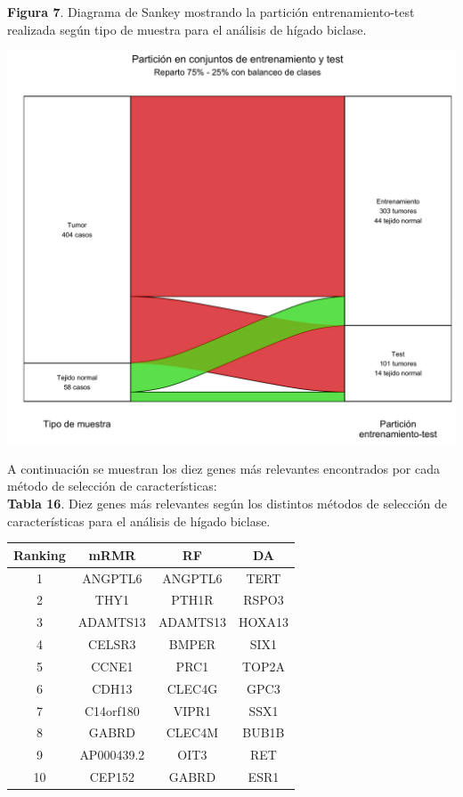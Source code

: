 \newpage
\begin{center}
	\textbf{Figura 7}. Diagrama de Sankey mostrando la partición entrenamiento-test realizada según tipo de muestra para el análisis de hígado biclase.
\end{center}
\begin{center}
	\includegraphics[width=.75\textwidth]{figuras/07_higado_biclase_sankey.png}
\end{center}

A continuación se muestran los diez genes más relevantes encontrados por cada método de selección de características:\\

\textbf{Tabla 16}. Diez genes más relevantes según los distintos métodos de selección de características para el análisis de hígado biclase.

\begin{table}[H]
	\centering
	\begin{tabular}{cccc}
		\hline
		\textbf{Ranking} & \textbf{mRMR} & \textbf{RF} & \textbf{DA} \\ \hline
		1                & ANGPTL6       & ANGPTL6     & TERT        \\
		2                & THY1          & PTH1R       & RSPO3       \\
		3                & ADAMTS13      & ADAMTS13    & HOXA13      \\
		4                & CELSR3        & BMPER       & SIX1        \\
		5                & CCNE1         & PRC1        & TOP2A       \\
		6                & CDH13         & CLEC4G      & GPC3        \\
		7                & C14orf180     & VIPR1       & SSX1        \\
		8                & GABRD         & CLEC4M      & BUB1B       \\
		9                & AP000439.2    & OIT3        & RET         \\
		10               & CEP152        & GABRD       & ESR1        \\ \hline
	\end{tabular}
\end{table}

